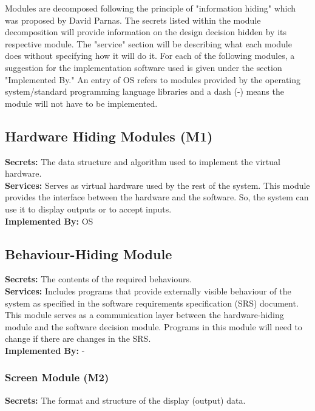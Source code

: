 \documentclass[12pt, letterpaper]{article}
\begin{document}
	\indent \indent Modules are decomposed following the principle of "information hiding" which was proposed by David Parnas. The secrets listed within the module decomposition will provide information on the design decision hidden by its respective module. The "service" section will be describing what each module does without specifying how it will do it. For each of the following modules, a suggestion for the implementation software used is given under the section "Implemented By." An entry of OS refers to modules provided by the operating system/standard programming language libraries and a dash (-) means the module will not have to be implemented.
	
	\subsection{Hardware Hiding Modules (M1)}
	\noindent \textbf{Secrets:} The data structure and algorithm used to implement the virtual \indent hardware.\\
	
	\noindent \textbf{Services:} Serves as virtual hardware used by the rest of the system. This \indent module provides the interface between the hardware and the software. \indent So, the system can use it to display outputs or to accept inputs.\\
	
	\noindent \textbf{Implemented By:} OS
	
	\subsection{Behaviour-Hiding Module}
	\noindent \textbf{Secrets:} The contents of the required behaviours.\\
	
	\noindent \textbf{Services:} Includes programs that provide externally visible behaviour of \indent the system as specified in the software requirements specification (SRS) \indent document. This module serves as a communication layer between the \indent hardware-hiding module and the software decision module. Programs in \indent this module will need to change if there are changes in the SRS.\\
	
	\noindent \textbf{Implemented By:} - 
	
	\subsubsection{Screen Module (M2)}
	\noindent \textbf{Secrets:} The format and structure of the display (output) data.\\
	
\end{document}
